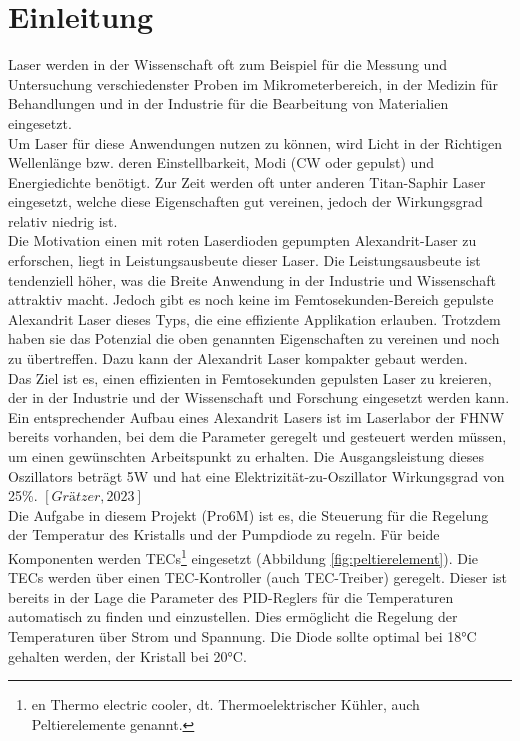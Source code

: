 \section{Einleitung}

Laser werden in der Wissenschaft oft zum Beispiel für die Messung und Untersuchung verschiedenster Proben im Mikrometerbereich, in der Medizin für Behandlungen und in der Industrie für die Bearbeitung von Materialien eingesetzt.\\
Um Laser für diese Anwendungen nutzen zu können, wird Licht in der Richtigen Wellenlänge bzw. deren Einstellbarkeit, Modi (CW oder gepulst) und Energiedichte benötigt. Zur Zeit werden oft unter anderen Titan-Saphir Laser eingesetzt, welche diese Eigenschaften gut vereinen, jedoch der Wirkungsgrad relativ niedrig ist.\\
Die Motivation einen mit roten Laserdioden gepumpten Alexandrit-Laser zu erforschen, liegt in Leistungsausbeute dieser Laser. Die Leistungsausbeute ist tendenziell höher, was die Breite Anwendung in der Industrie und Wissenschaft attraktiv macht. Jedoch gibt es noch keine im Femtosekunden-Bereich gepulste Alexandrit Laser dieses Typs, die eine effiziente Applikation erlauben. Trotzdem haben sie das Potenzial die oben genannten Eigenschaften zu vereinen und noch zu übertreffen. Dazu kann der Alexandrit Laser kompakter gebaut werden.\\

Das Ziel ist es, einen effizienten in Femtosekunden gepulsten Laser zu kreieren, der in der Industrie und der Wissenschaft und Forschung eingesetzt werden kann.\\
Ein entsprechender Aufbau eines Alexandrit Lasers ist im Laserlabor der FHNW bereits vorhanden, bei dem die Parameter geregelt und gesteuert werden müssen, um einen gewünschten Arbeitspunkt zu erhalten. Die Ausgangsleistung dieses Oszillators beträgt 5W und hat eine Elektrizität-zu-Oszillator Wirkungsgrad von 25\%. $[Grätzer, 2023]$\\  %

Die Aufgabe in diesem Projekt (Pro6M) ist es,  die Steuerung für die Regelung der Temperatur des Kristalls und der Pumpdiode zu regeln. Für beide Komponenten werden TECs\footnote{en Thermo electric cooler, dt. Thermoelektrischer Kühler, auch Peltierelemente genannt.} eingesetzt (Abbildung \ref{fig:peltierelement}).  Die TECs werden über einen TEC-Kontroller (auch TEC-Treiber) geregelt. Dieser ist bereits in der Lage  die Parameter des PID-Reglers für die Temperaturen automatisch zu finden und einzustellen. Dies ermöglicht die Regelung der Temperaturen über Strom und Spannung. Die Diode sollte optimal bei 18°C gehalten werden, der Kristall bei 20°C.

